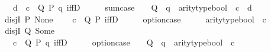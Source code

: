 \begin{isabellebody}
\ \ \ \ {\isachardoublequoteopen}\isactrlbold {\isasymlambda}{\isacharparenleft}{\kern0pt}d{\isacharcolon}{\kern0pt}\ {\isacharunderscore}{\kern0pt}{\isacharparenright}{\kern0pt}\ {\isacharparenleft}{\kern0pt}c{\isacharcolon}{\kern0pt}\ {\isacharunderscore}{\kern0pt}{\isacharparenright}{\kern0pt}\ Q\ P\ q{\isachardot}{\kern0pt}\ iffD{}\ {\isasymcdot}\ {\isacharunderscore}{\kern0pt}\ {\isasymcdot}\ {\isacharunderscore}{\kern0pt}\ {\isasymbullet}\ {\isacharparenleft}{\kern0pt}sum{\isachardot}{\kern0pt}case{\isacharunderscore}{\kern0pt}{}\ {\isasymcdot}\ {\isacharunderscore}{\kern0pt}\ {\isasymcdot}\ Q\ {\isasymcdot}\ q\ {\isasymbullet}\ arity{\isacharunderscore}{\kern0pt}type{\isacharunderscore}{\kern0pt}bool\ {\isasymbullet}\ c\ {\isasymbullet}\ d{\isacharparenright}{\kern0pt}{\isachardoublequoteclose}\isanewline
\isanewline
\ \ disjI{}\ {\isacharparenleft}{\kern0pt}P{\isacharparenright}{\kern0pt}{\isacharcolon}{\kern0pt}\ {\isachardoublequoteopen}None{\isachardoublequoteclose}\isanewline
\ \ \ \ {\isachardoublequoteopen}\isactrlbold {\isasymlambda}{\isacharparenleft}{\kern0pt}c{\isacharcolon}{\kern0pt}\ {\isacharunderscore}{\kern0pt}{\isacharparenright}{\kern0pt}\ Q\ P{\isachardot}{\kern0pt}\ iffD{}\ {\isasymcdot}\ {\isacharunderscore}{\kern0pt}\ {\isasymcdot}\ {\isacharunderscore}{\kern0pt}\ {\isasymbullet}\ {\isacharparenleft}{\kern0pt}option{\isachardot}{\kern0pt}case{\isacharunderscore}{\kern0pt}{}\ {\isasymcdot}\ {\isacharunderscore}{\kern0pt}\ {\isasymcdot}\ {\isacharunderscore}{\kern0pt}\ {\isasymbullet}\ arity{\isacharunderscore}{\kern0pt}type{\isacharunderscore}{\kern0pt}bool\ {\isasymbullet}\ c{\isacharparenright}{\kern0pt}{\isachardoublequoteclose}\isanewline
\isanewline
\ \ disjI{}\ {\isacharparenleft}{\kern0pt}Q{\isacharparenright}{\kern0pt}{\isacharcolon}{\kern0pt}\ {\isachardoublequoteopen}Some{\isachardoublequoteclose}\isanewline
\ \ \ \ {\isachardoublequoteopen}\isactrlbold {\isasymlambda}{\isacharparenleft}{\kern0pt}c{\isacharcolon}{\kern0pt}\ {\isacharunderscore}{\kern0pt}{\isacharparenright}{\kern0pt}\ Q\ P\ q{\isachardot}{\kern0pt}\ iffD{}\ {\isasymcdot}\ {\isacharunderscore}{\kern0pt}\ {\isasymcdot}\ {\isacharunderscore}{\kern0pt}\ {\isasymbullet}\ {\isacharparenleft}{\kern0pt}option{\isachardot}{\kern0pt}case{\isacharunderscore}{\kern0pt}{}\ {\isasymcdot}\ {\isacharunderscore}{\kern0pt}\ {\isasymcdot}\ Q\ {\isasymcdot}\ q\ {\isasymbullet}\ arity{\isacharunderscore}{\kern0pt}type{\isacharunderscore}{\kern0pt}bool\ {\isasymbullet}\ c{\isacharparenright}{\kern0pt}{\isachardoublequoteclose}\isanewline

\end{isabellebody}
